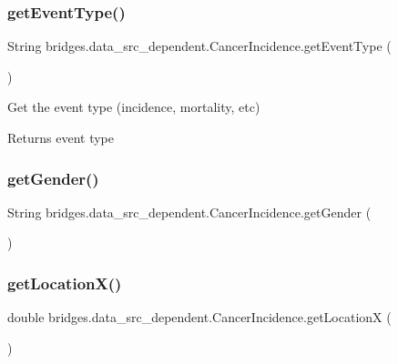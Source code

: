 \subsubsection{\texorpdfstring{getEventType()}{getEventType()}}
{\footnotesize\ttfamily String bridges.\+data\+\_\+src\+\_\+dependent.\+Cancer\+Incidence.\+get\+Event\+Type (\begin{DoxyParamCaption}{ }\end{DoxyParamCaption})}



Get the event type (incidence, mortality, etc) 

\begin{DoxyReturn}{Returns}
event type 
\end{DoxyReturn}
\mbox{\label{classbridges_1_1data__src__dependent_1_1_cancer_incidence_a2c3cbe65d89827c167f15314b8b088b3}} 
\subsubsection{\texorpdfstring{getGender()}{getGender()}}
{\footnotesize\ttfamily String bridges.\+data\+\_\+src\+\_\+dependent.\+Cancer\+Incidence.\+get\+Gender (\begin{DoxyParamCaption}{ }\end{DoxyParamCaption})}

\mbox{\label{classbridges_1_1data__src__dependent_1_1_cancer_incidence_a24aa8144dcacd93a26c3c033471666df}} 
\subsubsection{\texorpdfstring{getLocationX()}{getLocationX()}}
{\footnotesize\ttfamily double bridges.\+data\+\_\+src\+\_\+dependent.\+Cancer\+Incidence.\+get\+LocationX (\begin{DoxyParamCaption}{ }\end{DoxyParamCaption})}



